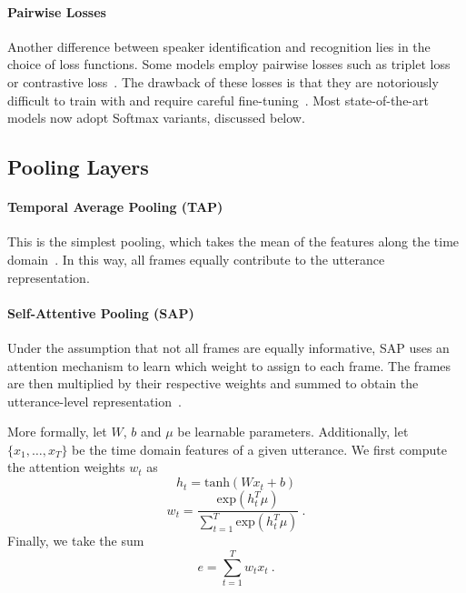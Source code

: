 \documentclass[conference]{IEEEtran}
\begin{document}
\paragraph{Pairwise Losses}Another difference between speaker identification and recognition lies in the choice of loss functions. Some models employ pairwise losses such as triplet loss or contrastive loss~\cite{cai2018exploring,chung2019delving}. The drawback of these losses is that they are notoriously difficult to train with and require careful fine-tuning~\cite{nagrani2020voxceleb}. Most state-of-the-art models now adopt Softmax variants, discussed below.

\subsection{Pooling Layers}

\paragraph{Temporal Average Pooling (TAP)}This is the simplest pooling, which takes the mean of the features along the time domain~\cite{cai2018exploring,chung2019delving}. In this way, all frames equally contribute to the utterance representation.

\paragraph{Self-Attentive Pooling (SAP)}Under the assumption that not all frames are equally informative, SAP uses an attention mechanism to learn which weight to assign to each frame. The frames are then multiplied by their respective weights and summed to obtain the utterance-level representation~\cite{cai2018exploring}.

More formally, let $W$, $b$ and $\mu$ be learnable parameters. Additionally, let $\{x_1,\dots,x_T\}$ be the time domain features of a given utterance. We first compute the attention weights $w_t$ as
\begin{equation}
    h_t = \text{tanh}(Wx_t + b)
\end{equation}
\begin{equation}
    w_t = \frac{\text{exp}(h_t^T\mu)}{\sum_{t=1}^T\text{exp}(h_t^T\mu)}~.
\end{equation}
Finally, we take the sum
\begin{equation}
    e = \sum_{t=1}^Tw_tx_t~.
\end{equation}
\end{document}
